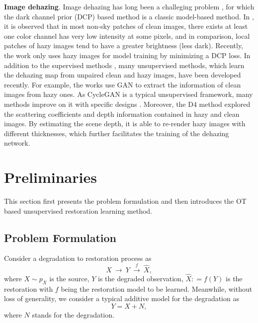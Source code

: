 \documentclass[10pt,journal,compsoc]{IEEEtran}
\begin{document}
\textbf{Image dehazing}. 
Image dehazing has long been a challeging problem \cite{fattal2008single}, 
for which the dark channel prior (DCP) based method \cite{he2010single} 
is a classic model-based method. In \cite{he2010single}, it is observed that
in most non-sky patches of clean images, there exists at least one color channel 
has very low intensity at some pixels, and in comparison, 
local patches of hazy images tend to have a greater brightness (less dark).
Recently, the work \cite{golts2019unsupervised} only uses hazy images for 
model training by minimizing a DCP loss. 
In addition to the supervised methods 
\cite{cai2016dehazenet,aodnet,dehamer,gcanet,ffanet},
many unsupervised methods, which learn the dehazing map from 
unpaired clean and hazy images, have been developed recently.
For example, the works \cite{yang2018towards, zhao2021refinednet} use GAN 
to extract the information of clean images from hazy ones. 
As CycleGAN is a typical unsupervised framework, many methods 
improve on it with specific designs 
\cite{dudhane2019cdnet, engin2018cycle, zhao2019dd, liu2020end}.
Moreover, the D4 method \cite{d4} explored the scattering coefficients and 
depth information contained in hazy and clean images. By estimating 
the scene depth, it is able to re-render hazy images with different 
thicknesses, which further facilitates the training of the dehazing network.


\section{Preliminaries}

This section first presents the problem formulation 
and then introduces the OT based unsupervised 
restoration learning method.

\subsection{Problem Formulation}

Consider a degradation to restoration process as
\[X~\longrightarrow ~Y ~\stackrel{f}{\longrightarrow} ~\hat{X},\]
where $X \sim {p_X}$ is the source, 
$Y$ is the degraded observation,
$\hat X: = f(Y)$ is the restoration with $f$
being the restoration model to be learned.
Meanwhile, without loss of generality, 
we consider a typical additive model for 
the degradation as
\begin{equation}
Y = X + N,
\label{eq_degradation}
\end{equation}
where $N$ stands for the degradation.
\end{document}
